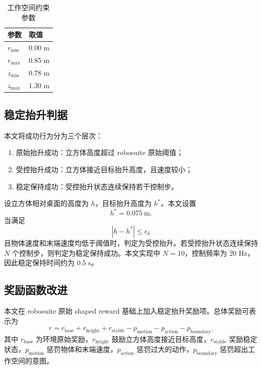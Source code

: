 \documentclass[
    type = bachelor,
    oneside,
    fontset = fandol
]{njuthesis}
\begin{document}
\begin{table}[htbp]
  \centering
  \caption{工作空间约束参数}
  \label{tab:workspace}
  \begin{tabular}{ll}
    \toprule
    参数 & 取值 \\
    \midrule
    $r_{\min}$ & 0.00 m \\
    $r_{\max}$ & 0.85 m \\
    $z_{\min}$ & 0.78 m \\
    $z_{\max}$ & 1.30 m \\
    \bottomrule
  \end{tabular}
\end{table}

\subsection{稳定抬升判据}

本文将成功行为分为三个层次：
\begin{enumerate}
  \item 原始抬升成功：立方体高度超过 robosuite 原始阈值；
  \item 受控抬升成功：立方体接近目标抬升高度，且速度较小；
  \item 稳定保持成功：受控抬升状态连续保持若干控制步。
\end{enumerate}

设立方体相对桌面的高度为 $h$，目标抬升高度为 $h^*$。本文设置
\begin{equation}
  h^* = 0.075\ \mathrm{m}.
\end{equation}
当满足
\begin{equation}
  |h-h^*| \le \epsilon_h
\end{equation}
且物体速度和末端速度均低于阈值时，判定为受控抬升。若受控抬升状态连续保持 $N$ 个控制步，则判定为稳定保持成功。本文实现中 $N=10$，控制频率为 20 Hz，因此稳定保持时间约为 0.5 s。

\subsection{奖励函数改进}

本文在 robosuite 原始 shaped reward 基础上加入稳定抬升奖励项。总体奖励可表示为
\begin{equation}
  r = r_{\mathrm{base}} + r_{\mathrm{height}} + r_{\mathrm{stable}}
  - p_{\mathrm{motion}} - p_{\mathrm{action}} - p_{\mathrm{boundary}}.
\end{equation}
其中 $r_{\mathrm{base}}$ 为环境原始奖励，$r_{\mathrm{height}}$ 鼓励立方体高度接近目标高度，$r_{\mathrm{stable}}$ 奖励稳定状态，$p_{\mathrm{motion}}$ 惩罚物体和末端速度，$p_{\mathrm{action}}$ 惩罚过大的动作，$p_{\mathrm{boundary}}$ 惩罚超出工作空间的意图。
\end{document}
